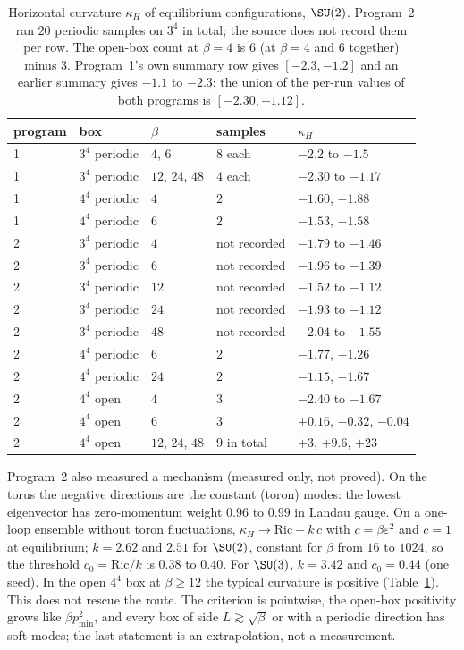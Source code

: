 \begin{table}[ht]
\centering
\small
\begin{tabular}{@{}lllll@{}}
\toprule
program & box & $\beta$ & samples & $\kappa_H$ \\
\midrule
1 & $3^4$ periodic & $4$, $6$ & $8$ each & $-2.2$ to $-1.5$ \\
1 & $3^4$ periodic & $12$, $24$, $48$ & $4$ each & $-2.30$ to $-1.17$ \\
1 & $4^4$ periodic & $4$ & $2$ & $-1.60$, $-1.88$ \\
1 & $4^4$ periodic & $6$ & $2$ & $-1.53$, $-1.58$ \\
2 & $3^4$ periodic & $4$ & not recorded & $-1.79$ to $-1.46$ \\
2 & $3^4$ periodic & $6$ & not recorded & $-1.96$ to $-1.39$ \\
2 & $3^4$ periodic & $12$ & not recorded & $-1.52$ to $-1.12$ \\
2 & $3^4$ periodic & $24$ & not recorded & $-1.93$ to $-1.12$ \\
2 & $3^4$ periodic & $48$ & not recorded & $-2.04$ to $-1.55$ \\
2 & $4^4$ periodic & $6$ & $2$ & $-1.77$, $-1.26$ \\
2 & $4^4$ periodic & $24$ & $2$ & $-1.15$, $-1.67$ \\
\midrule
2 & $4^4$ open & $4$ & $3$ & $-2.40$ to $-1.67$ \\
2 & $4^4$ open & $6$ & $3$ & $+0.16$, $-0.32$, $-0.04$ \\
2 & $4^4$ open & $12$, $24$, $48$ & $9$ in total & $+3$, $+9.6$, $+23$ \\
\bottomrule
\end{tabular}
\caption{Horizontal curvature $\kappa_H$ of equilibrium configurations, $\SU(2)$. Program~2 ran
$20$ periodic samples on $3^4$ in total; the source does not record them per row. The open-box
count at $\beta=4$ is $6$ (at $\beta=4$ and $6$ together) minus $3$. Program~1's own summary row
gives $[-2.3,-1.2]$ and an earlier summary gives $-1.1$ to $-2.3$; the union of the per-run values
of both programs is $[-2.30,-1.12]$.}
\label{neg:tab-curv}
\end{table}

Program~2 also measured a mechanism (measured only, not proved). On the torus the negative directions are
the constant (toron) modes: the lowest eigenvector has zero-momentum weight $0.96$ to $0.99$ in
Landau gauge. On a one-loop ensemble without toron fluctuations, $\kappa_H\to\mathrm{Ric}-k\,c$
with $c=\beta\varepsilon^2$ and $c=1$ at equilibrium; $k=2.62$ and $2.51$ for $\SU(2)$,
constant for $\beta$ from $16$ to $1024$, so the threshold $c_0=\mathrm{Ric}/k$ is $0.38$ to
$0.40$. For $\SU(3)$, $k=3.42$ and $c_0=0.44$ (one seed). In the open $4^4$ box at $\beta\ge12$
the typical curvature is positive (Table~\ref{neg:tab-curv}). This does not rescue the route.
The criterion is pointwise, the open-box positivity grows like $\beta p_{\min}^2$, and every box
of side $L\gtrsim\sqrt\beta$ or with a periodic direction has soft modes; the last statement is
an extrapolation, not a measurement.

